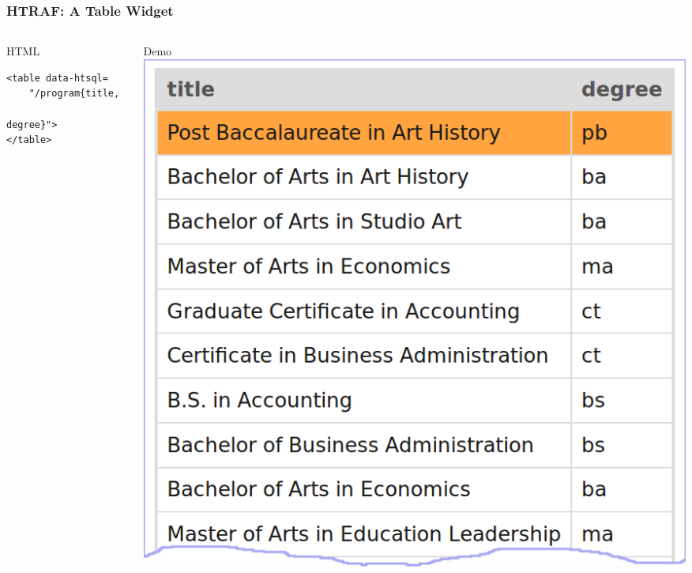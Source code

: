 \documentclass{beamer}
\begin{document}
\begin{frame}[containsverbatim]
\frametitle{HTRAF: A Table Widget}
\begin{columns}[c]
\begin{column}[T]{.5\textwidth}
\begin{block}{HTML}
\small
\begin{lstlisting}
<table data-htsql=
    "/program{title,
              degree}">
</table>
\end{lstlisting}
\end{block}
\end{column}
\begin{column}[T]{.5\textwidth}
\begin{block}{Demo}
\includegraphics[width=\textwidth]{img/htraf-2.png}
\end{block}
\end{column}
\end{columns}
\end{frame}
\end{document}
